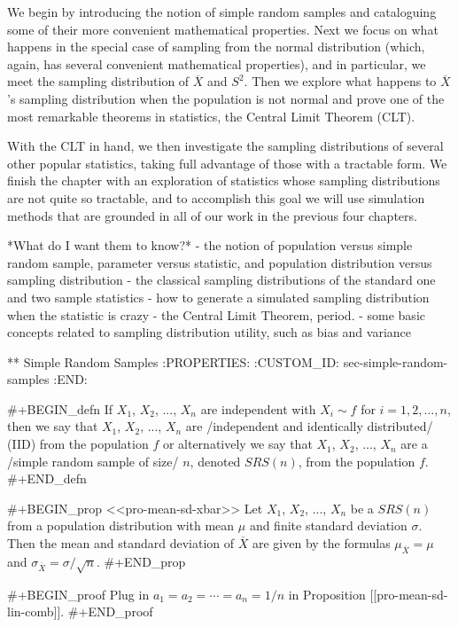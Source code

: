 We begin by introducing the notion of simple random samples and
cataloguing some of their more convenient mathematical
properties. Next we focus on what happens in the special case of
sampling from the normal distribution (which, again, has several
convenient mathematical properties), and in particular, we meet the
sampling distribution of \(\overline{X}\) and \(S^{2}\). Then we
explore what happens to \(\overline{X}\)'s sampling distribution when
the population is not normal and prove one of the most remarkable
theorems in statistics, the Central Limit Theorem (CLT).

With the CLT in hand, we then investigate the sampling distributions
of several other popular statistics, taking full advantage of those
with a tractable form. We finish the chapter with an exploration of
statistics whose sampling distributions are not quite so tractable,
and to accomplish this goal we will use simulation methods that are
grounded in all of our work in the previous four chapters.

*What do I want them to know?*
- the notion of population versus simple random sample, parameter
  versus statistic, and population distribution versus sampling
  distribution
- the classical sampling distributions of the standard one and two
  sample statistics
- how to generate a simulated sampling distribution when the statistic
  is crazy
- the Central Limit Theorem, period.
- some basic concepts related to sampling distribution utility, such
  as bias and variance

** Simple Random Samples
:PROPERTIES:
:CUSTOM_ID: sec-simple-random-samples
:END:

#+BEGIN_defn
If \(X_{1}\), \(X_{2}\), ..., \(X_{n}\) are independent with
\(X_{i}\sim f\) for \(i=1,2,\ldots,n\), then we say that \(X_{1}\),
\(X_{2}\), ..., \(X_{n}\) are /independent and identically
distributed/ (IID) from the population \(f\) or alternatively we say
that \(X_{1}\), \(X_{2}\), ..., \(X_{n}\) are a /simple random sample
of size/ \(n\), denoted \(SRS(n)\), from the population \(f\).
#+END_defn

#+BEGIN_prop
<<pro-mean-sd-xbar>> Let \(X_{1}\), \(X_{2}\), ..., \(X_{n}\) be a
\(SRS(n)\) from a population distribution with mean \(\mu\) and finite
standard deviation \(\sigma\). Then the mean and standard deviation of
\(\overline{X}\) are given by the formulas \(\mu_{\overline{X}}=\mu\)
and \(\sigma_{\overline{X}}=\sigma/\sqrt{n}\).
#+END_prop

#+BEGIN_proof
Plug in \(a_{1}=a_{2}=\cdots=a_{n}=1/n\) in Proposition
[[pro-mean-sd-lin-comb]].
#+END_proof

